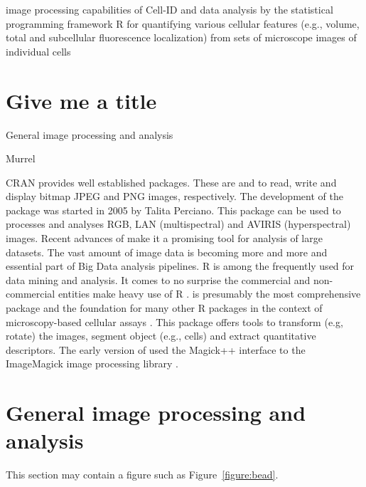 image processing capabilities of Cell-ID and data analysis by the statistical 
programming framework R for quantifying various cellular features (e.g., volume, 
total and subcellular fluorescence localization) from sets of microscope 
images of individual cells \citep{bush_using_2012}


\section{Give me a title}

General image processing and analysis


\citep{tabelow_modeling_2012, tabelow_dti:_2014}

Murrel \citep{murrell_raster_2011}
\citep{mmand} \citep{clayden_mmand:_2016}

CRAN provides well established packages. These are  
\citep{urbanek_jpeg:_2014} and  \citep{urbanek_png:_2013} to 
read, write and display bitmap JPEG and PNG images, respectively. The 
development of the  \citep{perciano_ripa:_2014} package was started in 2005 by Talita Perciano. 
This package can be used to processes and analyses RGB, LAN (multispectral) 
and AVIRIS (hyperspectral) images. Recent advances of  make it a promising 
tool for analysis of large datasets. The vast amount of image data is becoming 
more and more and essential part of Big Data analysis pipelines. R is among 
the frequently used for data mining and analysis. It comes to no surprise the 
commercial and non-commercial entities make heavy use of R \citep{chen_big_2014}.  \citep{pau_ebimager_2010} 
is presumably the most comprehensive package and the foundation for many other 
R packages in the context of microscopy-based cellular assays \citep{gowen_near_2015}. This 
package offers tools to transform (e.g, rotate) the images, segment object 
(e.g., cells) and extract quantitative descriptors. The early version of 
 used the Magick++ interface to the ImageMagick image processing 
library \citep{sklyar_image_2006}.

\section{General image processing and analysis}

This section may contain a figure such as Figure~\ref{figure:bead}.

